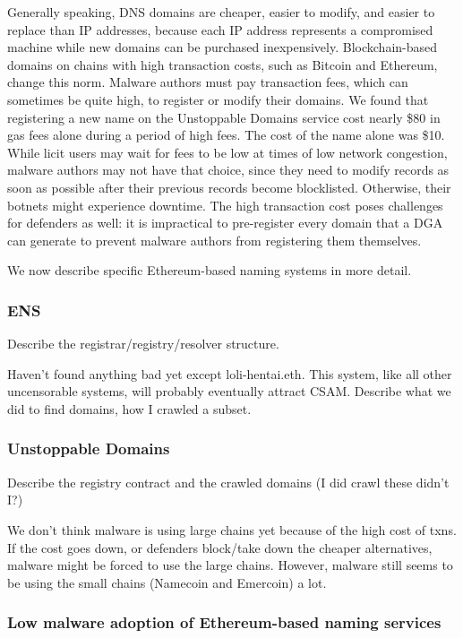 \documentclass[10pt,sigconf,letterpaper]{acmart}
\begin{document}
Generally speaking, DNS domains are cheaper, easier to modify, and easier to replace than IP 
addresses, because each IP address represents a compromised machine while new domains can be 
purchased inexpensively. Blockchain-based domains on chains with high transaction costs, such as 
Bitcoin and Ethereum, change this norm. Malware authors must pay transaction fees, which can 
sometimes be quite high, to register or modify their domains. We found that registering a new name 
on the Unstoppable Domains service cost nearly \$80 in gas fees alone during a period of high fees. 
The cost of the name alone was \$10. While licit users may wait for fees to be low at times of low 
network congestion, malware authors may not have that choice, since they need to modify records as 
soon as possible after their previous records become blocklisted. Otherwise, their botnets might 
experience downtime. The high transaction cost poses challenges for defenders as well: it is 
impractical to pre-register every domain that a DGA can generate to prevent malware authors from 
registering them themselves. 

We now describe specific Ethereum-based naming systems in more detail.

\subsubsection{ENS}

Describe the registrar/registry/resolver structure.

Haven't found anything bad yet except loli-hentai.eth. This 
system, like all other uncensorable systems, will probably 
eventually attract CSAM. Describe what we did to find 
domains, how I crawled a subset.

\subsubsection{Unstoppable Domains}

Describe the registry contract and the crawled domains (I did 
crawl these didn't I?)

We don't think malware is using large chains yet because of 
the high cost of txns. If the cost goes down, or defenders 
block/take down the cheaper alternatives, malware might be 
forced to use the large chains. However, malware still seems 
to be using the small chains (Namecoin and Emercoin) a lot.

\subsubsection{Low malware adoption of Ethereum-based naming services}
\end{document}

